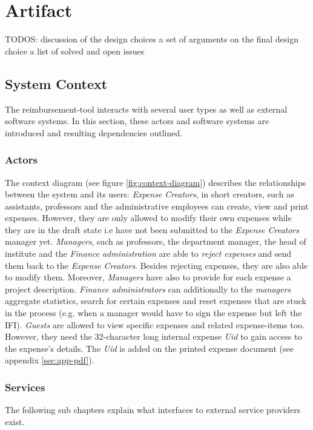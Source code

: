 \chapter{Artifact}

TODOS:
 discussion of the design choices  a set of arguments on the final design choice
 a list of solved and open issues




\section{System Context}

The reimbursement-tool interacts with several user types as well as external software systems. In this section, these actors and software systems are introduced and resulting dependencies outlined.

\subsection{Actors}

The context diagram (see figure \ref{fig:context-diagram}) describes the relationships between the system and its users:
 \textit{Expense Creators}, in short creators, such as assistants, professors and the administrative employees can create, view and print expenses. However, they are only allowed to modify their own expenses while they are in the draft state i.e have not been submitted to the \textit{Expense Creators} manager yet.  \textit{Managers}, such as professors, the department manager, the head of institute and the \textit{Finance administration} are able to \textit{reject expenses} and send them back to the \textit{Expense Creators}. Besides rejecting expenses, they are also able to modify them. Moreover, \textit{Managers} have also to provide for each expense a project description. \textit{Finance administrators} can additionally to the \textit{managers} aggregate statistics, search for certain expenses and reset expenses that are stuck in the process (e.g. when a manager would have to sign the expense but left the IFI). \textit{Guests} are allowed to view specific expenses and related expense-items too. However, they need the 32-character long internal expense \textit{Uid} to gain access to the expense's details. The \textit{Uid} is added on the printed expense document (see appendix \ref{sec:app-pdf}).

\subsection{Services}
The following sub chapters explain what interfaces to external service providers exist.

